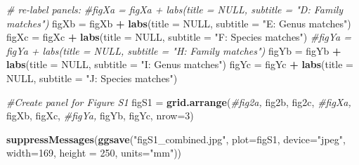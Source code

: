 \documentclass[
]{article}
\newenvironment{Shaded}{\begin{snugshade}}{\end{snugshade}}
\newcommand{\CommentTok}[1]{\textcolor[rgb]{0.56,0.35,0.01}{\textit{#1}}}
\newcommand{\DataTypeTok}[1]{\textcolor[rgb]{0.13,0.29,0.53}{#1}}
\newcommand{\DecValTok}[1]{\textcolor[rgb]{0.00,0.00,0.81}{#1}}
\newcommand{\KeywordTok}[1]{\textcolor[rgb]{0.13,0.29,0.53}{\textbf{#1}}}
\newcommand{\NormalTok}[1]{#1}
\newcommand{\OperatorTok}[1]{\textcolor[rgb]{0.81,0.36,0.00}{\textbf{#1}}}
\newcommand{\OtherTok}[1]{\textcolor[rgb]{0.56,0.35,0.01}{#1}}
\newcommand{\StringTok}[1]{\textcolor[rgb]{0.31,0.60,0.02}{#1}}
\begin{document}
\begin{Shaded}
\begin{Highlighting}[]
\CommentTok{# re-label panels: }
\CommentTok{#figXa = figXa + labs(title = NULL, subtitle = "D: Family matches")}
\NormalTok{figXb =}\StringTok{ }\NormalTok{figXb }\OperatorTok{+}\StringTok{ }\KeywordTok{labs}\NormalTok{(}\DataTypeTok{title =} \OtherTok{NULL}\NormalTok{, }\DataTypeTok{subtitle =} \StringTok{"E: Genus matches"}\NormalTok{)}
\NormalTok{figXc =}\StringTok{ }\NormalTok{figXc }\OperatorTok{+}\StringTok{ }\KeywordTok{labs}\NormalTok{(}\DataTypeTok{title =} \OtherTok{NULL}\NormalTok{, }\DataTypeTok{subtitle =} \StringTok{"F: Species matches"}\NormalTok{)}
\CommentTok{#figYa = figYa + labs(title = NULL, subtitle = "H: Family matches")}
\NormalTok{figYb =}\StringTok{ }\NormalTok{figYb }\OperatorTok{+}\StringTok{ }\KeywordTok{labs}\NormalTok{(}\DataTypeTok{title =} \OtherTok{NULL}\NormalTok{, }\DataTypeTok{subtitle =} \StringTok{"I: Genus matches"}\NormalTok{)}
\NormalTok{figYc =}\StringTok{ }\NormalTok{figYc }\OperatorTok{+}\StringTok{ }\KeywordTok{labs}\NormalTok{(}\DataTypeTok{title =} \OtherTok{NULL}\NormalTok{, }\DataTypeTok{subtitle =} \StringTok{"J: Species matches"}\NormalTok{)}

\CommentTok{#Create panel for Figure S1}
\NormalTok{figS1 =}\StringTok{ }\KeywordTok{grid.arrange}\NormalTok{(}\CommentTok{#fig2a, }
\NormalTok{  fig2b, fig2c, }\CommentTok{#figXa, }
\NormalTok{  figXb, figXc, }\CommentTok{#figYa, }
\NormalTok{  figYb, figYc, }\DataTypeTok{nrow=}\DecValTok{3}\NormalTok{)}
\end{Highlighting}
\end{Shaded}

\begin{Shaded}
\begin{Highlighting}[]
\KeywordTok{suppressMessages}\NormalTok{(}\KeywordTok{ggsave}\NormalTok{(}\StringTok{"figS1_combined.jpg"}\NormalTok{, }\DataTypeTok{plot=}\NormalTok{figS1, }\DataTypeTok{device=}\StringTok{"jpeg"}\NormalTok{, }\DataTypeTok{width=}\DecValTok{169}\NormalTok{, }\DataTypeTok{height =} \DecValTok{250}\NormalTok{, }\DataTypeTok{units=}\StringTok{"mm"}\NormalTok{))}
\end{Highlighting}
\end{Shaded}
\end{document}
